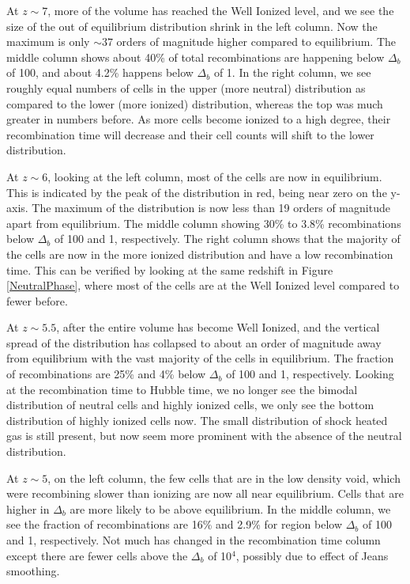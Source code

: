 At $z\sim7$, more of the volume has reached the Well Ionized level, and we see the size of the out of equilibrium distribution shrink in the left column.  Now the maximum is only $\sim37$ orders of magnitude higher compared to equilibrium.  The middle column shows about 40\% of total recombinations are happening below $\Delta_b$ of 100, and about 4.2\% happens below $\Delta_b$ of 1.  In the right column, we see roughly equal numbers of cells in the upper (more neutral) distribution as compared to the lower (more ionized) distribution, whereas the top was much greater in numbers before.  As more cells become ionized to a high degree, their recombination time will decrease and their cell counts will shift to the lower distribution.

At $z\sim6$, looking at the left column, most of the cells are now in equilibrium.  This is indicated by the peak of the distribution in red, being near zero on the y-axis.  The maximum of the distribution is now less than 19 orders of magnitude apart from equilibrium.  The middle column showing 30\% to 3.8\% recombinations below $\Delta_b$ of 100 and 1, respectively.  The right column shows that the majority of the cells are now in the more ionized distribution and have a low recombination time.  This can be verified by looking at the same redshift in Figure \ref{NeutralPhase}, where most of the cells are at the Well Ionized level compared to fewer before.

At $z\sim5.5$, after the entire volume has become Well Ionized, and the vertical spread of the distribution has collapsed to about an order of magnitude away from equilibrium with the vast majority of the cells in equilibrium.  The fraction of recombinations are 25\% and 4\% below $\Delta_b$ of 100 and 1, respectively.  Looking at the recombination time to Hubble time, we no longer see the bimodal distribution of neutral cells and highly ionized cells, we only see the bottom distribution of highly ionized cells now.  The small distribution of shock heated gas is still present, but now seem more prominent with the absence of the neutral distribution.

At $z\sim5$, on the left column, the few cells that are in the low density void, which were recombining slower than ionizing are now all near equilibrium.  Cells that are higher in $\Delta_b$ are more likely to be above equilibrium.  In the middle column, we see the fraction of recombinations are 16\% and 2.9\% for region below $\Delta_b$ of 100 and 1, respectively.  Not much has  changed in the recombination time column except there are fewer cells above the $\Delta_b$ of 10$^4$, possibly due to effect of Jeans smoothing.

